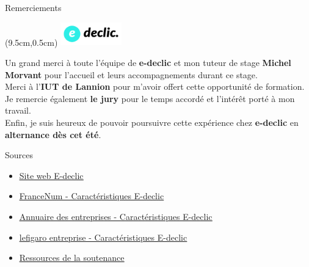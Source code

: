 \documentclass{beamer}
\newcommand{\logoEdeclic}{
	\begin{textblock*}{2cm}(9.5cm,0.5cm)
  		\includegraphics[height=1cm]{../img/logo_e-declic.png}
	\end{textblock*}
}
\begin{document}
\begin{frame}[label=remerciements]{\Large Remerciements}
    \logoEdeclic
    \begin{center}
        \vspace{1em}
        \begin{minipage}{0.9\textwidth}
        		Un grand merci à toute l'équipe de \textbf{e-declic} et mon tuteur de stage \textbf{Michel Morvant} pour l'accueil et leurs accompagnements durant ce stage. \vspace{0.25cm} \\
            Merci à l'\textbf{IUT de Lannion} pour m'avoir offert cette opportunité de formation. \vspace{0.25cm} \\
            Je remercie également \textbf{le jury} pour le temps accordé et l'intérêt porté à mon travail. \vspace{0.25cm} \\
            Enfin, je suis heureux de pouvoir poursuivre cette expérience chez \textbf{e-declic} en \textbf{alternance dès cet été}.
        \end{minipage}
    \end{center}
    \vfill
\end{frame}

\begin{frame}[label=sources]{Sources}
	\begin{itemize}
		\item \href{https://www.e-declic.com/}{\underline{Site web E-declic}}
		\item \href{https://www.francenum.gouv.fr/activateurs/e-declic}{\underline{FranceNum - Caractéristiques E-declic}}
		\item \href{https://annuaire-entreprises.data.gouv.fr/entreprise/e-declic-453413296}{\underline{Annuaire des entreprises - Caractéristiques E-declic}}
		\item \href{https://entreprises.lefigaro.fr/e-declic-56/entreprise-453413296}{\underline{lefigaro entreprise - Caractéristiques E-declic}}
		\item \href{https://github.com/Matteo-K/Soutenance_E-delic/tree/main/img}{\underline{Ressources de la soutenance}}
	\end{itemize}
	\vfill
\end{frame}
\end{document}
